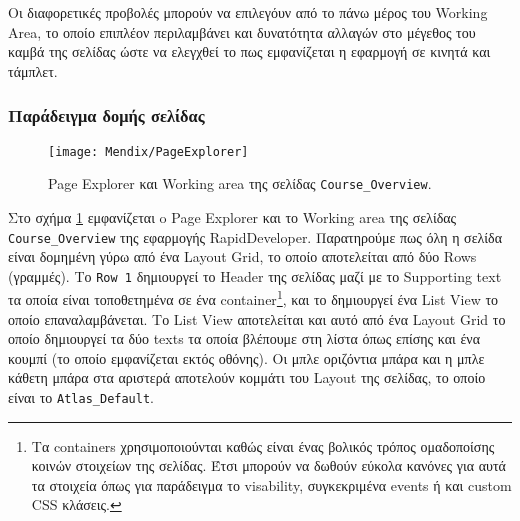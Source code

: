             Οι διαφορετικές προβολές μπορούν να επιλεγόυν από το πάνω μέρος του Working Area, το οποίο επιπλέον περιλαμβάνει και δυνατότητα αλλαγών στο μέγεθος του καμβά της σελίδας ώστε να ελεγχθεί το πως εμφανίζεται η εφαρμογή σε κινητά και τάμπλετ.

        \subsubsection{Παράδειγμα δομής σελίδας}
            \begin{figure}[h!] \noindent \centering
                \texttt{[image: Mendix/PageExplorer]}
                \caption{\centering Page Explorer και Working area της σελίδας \texttt{Course\_Overview}.}
                \label{fig:MendixPageExplorer}
            \end{figure}

            Στο σχήμα \ref{fig:MendixPageExplorer} εμφανίζεται o Page Explorer και το Working area της σελίδας \verb|Course_Overview| της εφαρμογής RapidDeveloper. Παρατηρούμε πως όλη η σελίδα είναι δομημένη γύρω από ένα Layout Grid, το οποίο αποτελείται από δύο Rows (γραμμές). Το \texttt{Row 1} δημιουργεί το Header της σελίδας μαζί με το Supporting text τα οποία είναι τοποθετημένα σε ένα container\footnote{Τα containers χρησιμοποιούνται καθώς είναι ένας βολικός τρόπος ομαδοποίσης κοινών στοιχείων της σελίδας. Έτσι μπορούν να δωθούν εύκολα κανόνες για αυτά τα στοιχεία όπως για παράδειγμα το visability, συγκεκριμένα events ή και custom CSS κλάσεις.}, και το  δημιουργεί ένα List View το οποίο επαναλαμβάνεται. Το List View αποτελείται και αυτό από ένα Layout Grid το οποίο δημιουργεί τα δύο texts τα οποία βλέπουμε στη λίστα όπως επίσης και ένα κουμπί (το οποίο εμφανίζεται εκτός οθόνης). Οι μπλε οριζόντια μπάρα και η μπλε κάθετη μπάρα στα αριστερά αποτελούν κομμάτι του Layout της σελίδας, το οποίο είναι το \verb|Atlas_Default|.


